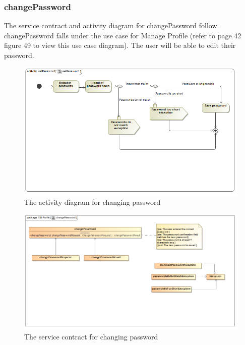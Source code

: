\documentclass[a4paper,12pt]{report}
\begin{document}
\subsubsection{changePassword}
The service contract and activity diagram for changePassword follow. changePassword falls under the use case for Manage Profile (refer to page 42 figure 49 to view this use case diagram). The user will be able to edit their password.
\begin{figure}[H]
  \centering
    \includegraphics[width=1.0\textwidth]{../Diagrams/ManageProfile/ActivityDiagrams/setPassword1.png}
    \caption{The activity diagram for changing password} 
\end{figure}
	
\begin{figure}[H]
	\centering
	\includegraphics[width=1.0\textwidth]{../Diagrams/ManageProfile/serviceContracts/changePasswordServiceContract.png}
	\caption{The service contract for changing password}
\end{figure}
\end{document}
